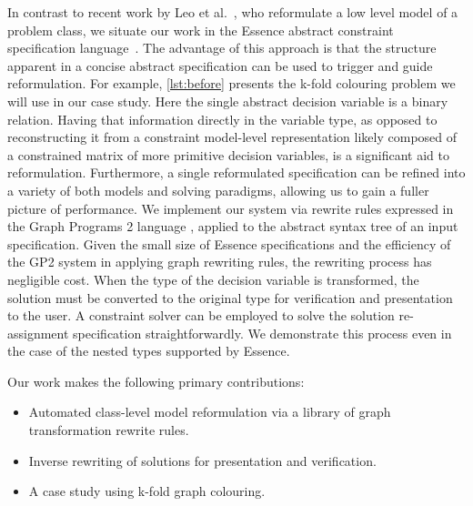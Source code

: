 \documentclass[anonymous,a4paper,UKenglish,cleveref,pdfa]{lipics-v2021}
\begin{document}
In contrast to recent work by Leo et al.~\cite{Leo2024:automatic}, who reformulate a low level model of a problem class, we situate our work in the {\sc Essence} abstract constraint specification language~\cite{frisch2008:essence}. The advantage of this approach is that the structure apparent in a concise abstract specification can be used to trigger and guide reformulation. For example, \cref{lst:before} presents the k-fold colouring problem we will use in our case study. Here the single abstract decision variable is a binary relation. Having that information directly in the variable type, as opposed to reconstructing it from a constraint model-level representation likely composed of a constrained matrix of more primitive decision variables, is a significant aid to reformulation. Furthermore, a single reformulated specification can be refined into a variety of both models and solving paradigms, allowing us to gain a fuller picture of performance. We implement our system via rewrite rules expressed in the Graph Programs 2 language \cite{campbell2020improved,plump2017imperative}, applied to the abstract syntax tree of an input specification. Given the small size of {\sc Essence} specifications and the efficiency of the GP2 system in applying graph rewriting rules, the rewriting process has negligible cost. When the type of the decision variable is transformed, the solution must be converted to the original type for verification and presentation to the user. A constraint solver can be employed to solve the solution re-assignment specification straightforwardly. We demonstrate this process even in the case of the nested types supported by {\sc Essence}.


Our work makes the following primary contributions:
\begin{itemize}
\item Automated class-level model reformulation via a library of graph transformation rewrite rules.
\item Inverse rewriting of solutions for presentation and verification.
\item A case study using k-fold graph colouring.
\end{itemize}
\end{document}
